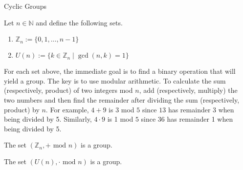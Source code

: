\begin{section}{Cyclic Groups}
\begin{definition}
Let $n\in\mathbb{N}$ and define the following sets.
\begin{enumerate}
\item $\mathbb{Z}_n:=\{0,1,\ldots,n-1\}$
\item $U(n):=\{k\in\mathbb{Z}_n\mid \gcd(n,k)=1\}$
\end{enumerate}
\end{definition}

For each set above, the immediate goal is to find a binary operation that will yield a group.  The key is to use modular arithmetic.  To calculate the sum (respectively, product) of two integers mod $n$, add (respectively, multiply) the two numbers and then find the remainder after dividing the sum (respectively, product) by $n$. For example, $4+9$ is $3$ mod $5$ since $13$ has remainder 3 when being divided by 5.  Similarly, $4\cdot 9$ is 1 mod $5$ since 36 has remainder 1 when being divided by 5.

\begin{theorem}
The set $(\mathbb{Z}_n,+\text{ mod }n)$ is a group.  
\end{theorem}

\begin{theorem}
The set $(U(n),\cdot\text{ mod }n)$ is a group.  
\end{theorem}

%
%
%
%
%
%


\end{section}
